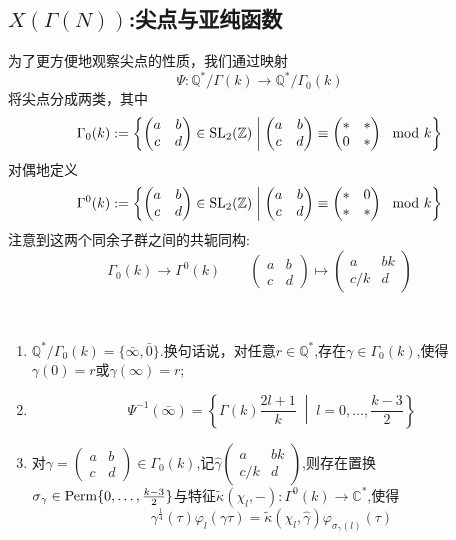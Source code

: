 \subsection{$X(\Gamma(N))$:尖点与亚纯函数}
为了更方便地观察尖点的性质，我们通过映射
$$\Psi: \mathbb{Q}^*/\Gamma(k) \longrightarrow \mathbb{Q}^*/\Gamma_0(k)$$
将尖点分成两类，其中
$$\Gamma_0(k):=\left\{ \begin{pmatrix}
a &b \\ c & d
\end{pmatrix} \in \operatorname{SL}_2(\mathbb{Z}) \;\middle|\; \begin{pmatrix}
a &b \\ c & d
\end{pmatrix} \equiv \begin{pmatrix}
* & * \\ 0 & *
\end{pmatrix} \mod k  \right\}$$
对偶地定义
$$\Gamma^0(k):=\left\{ \begin{pmatrix}
a & b \\ c & d
\end{pmatrix} \in \operatorname{SL}_2(\mathbb{Z}) \;\middle|\; \begin{pmatrix}
a & b \\ c & d
\end{pmatrix} \equiv \begin{pmatrix}
* & 0 \\ * & *
\end{pmatrix} \mod k  \right\}$$
注意到这两个同余子群之间的共轭同构:
$$\Gamma_0(k) \longrightarrow \Gamma^0(k) \qquad \begin{pmatrix}
a & b \\ c & d
\end{pmatrix} \longmapsto \begin{pmatrix}
a & bk \\ c/k & d
\end{pmatrix}$$
\begin{lemma}\
	\begin{enumerate}[(1)]
		\item $\mathbb{Q}^*/\Gamma_0(k)=\{\bar{\infty}, \bar{0} \}$.换句话说，对任意$r \in \mathbb{Q}^*$,存在$\gamma \in \Gamma_0(k)$,使得$\gamma (0)=r$或$\gamma (\infty)=r$;
		\item $$\Psi^{-1}(\bar{\infty})= \left\{ \Gamma(k) \frac{2l+1}{k} \;\middle|\; l=0,\ldots,\frac{k-3}{2} \right\}$$
		\item 对$\gamma=\left(\begin{smallmatrix}
		a & b \\ c & d
		\end{smallmatrix}\right) \in \Gamma_0(k)$,记$\hat{\gamma}\left(\begin{smallmatrix}
		a & bk \\ c/k & d
		\end{smallmatrix}\right)$,则存在置换$\sigma_{\gamma} \in \operatorname{\operatorname{Perm}} \{0,\ldots,\frac{k-3}{2} \}$与特征$\tilde{\kappa}(\chi_l,-):\Gamma^0(k) \longrightarrow \mathbb{C}^*$,使得
		$$\gamma^{\frac{1}{4}}(\tau)\varphi_l(\gamma\tau)=\tilde{\kappa}(\chi_l,\hat{\gamma})\varphi_{\sigma_{\gamma}(l)}(\tau) $$
	\end{enumerate}
	
\end{lemma}
